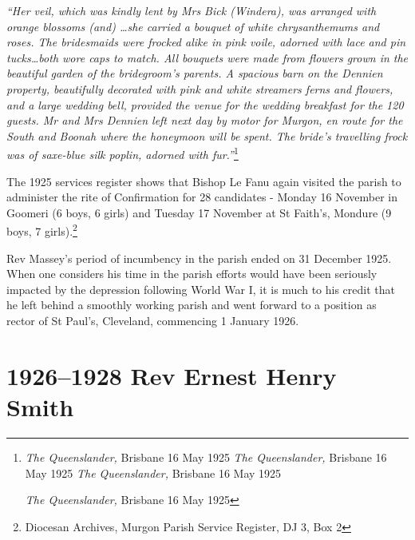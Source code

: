 \emph{``Her veil, which was kindly lent by Mrs Bick (Windera), was arranged with orange blossoms (and) \ldots she carried a bouquet of white chrysanthemums and roses. The bridesmaids were frocked alike in pink voile, adorned with lace and pin tucks\ldots both wore caps to match. All bouquets were made from flowers grown in the beautiful garden of the bridegroom's parents. A spacious barn on the Dennien property, beautifully decorated with pink and white streamers ferns and flowers, and a large wedding bell, provided the venue for the wedding breakfast for the 120 guests. Mr and Mrs Dennien left next day by motor for Murgon, en route for the South and Boonah where the honeymoon will be spent. The bride's travelling frock was of saxe-blue silk poplin, adorned with fur.''}\footnote{\emph{The Queenslander,} Brisbane 16 May 1925 \emph{The Queenslander,} Brisbane 16 May 1925 \emph{The Queenslander,} Brisbane 16 May 1925


  \emph{The Queenslander,} Brisbane 16 May 1925}



\smallskip


The 1925 services register shows that Bishop Le Fanu again visited the parish to administer the rite of Confirmation for 28 candidates - Monday 16 November in Goomeri (6 boys, 6 girls) and Tuesday 17 November at St Faith's, Mondure (9 boys, 7 girls).\footnote{Diocesan Archives, Murgon Parish Service Register, DJ 3, Box 2}


Rev Massey's period of incumbency in the parish ended on 31 December 1925. When one considers his time in the parish efforts would have been seriously impacted by the depression following World War I, it is much to his credit that he left behind a smoothly working parish and went forward to a position as rector of St Paul's, Cleveland, commencing 1 January 1926.



\balance


\printendnotes[custom]
\setcounter{endnote}{0}
\chapter{1926--1928 Rev Ernest Henry Smith}
\nobalance








